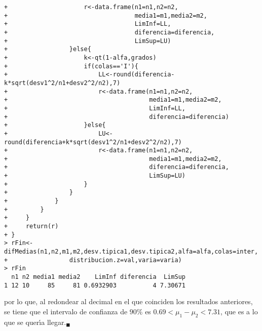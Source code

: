 \begin{solucion}
\begin{verbatim}
+                     r<-data.frame(n1=n1,n2=n2,
+                                   media1=m1,media2=m2,
+                                   LimInf=LL,
+                                   diferencia=diferencia,
+                                   LimSup=LU)
+                 }else{
+                     k<-qt(1-alfa,grados)
+                     if(colas=='I'){
+                         LL<-round(diferencia-k*sqrt(desv1^2/n1+desv2^2/n2),7)
+                         r<-data.frame(n1=n1,n2=n2,
+                                       media1=m1,media2=m2,
+                                       LimInf=LL,
+                                       diferencia=diferencia)
+                     }else{
+                         LU<-round(diferencia+k*sqrt(desv1^2/n1+desv2^2/n2),7)
+                         r<-data.frame(n1=n1,n2=n2,
+                                       media1=m1,media2=m2,
+                                       diferencia=diferencia,
+                                       LimSup=LU)
+                     }
+                 }
+             }
+         }
+     }
+     return(r)
+ }
> rFin<-difMedias(n1,n2,m1,m2,desv.tipica1,desv.tipica2,alfa=alfa,colas=inter,
+                 distribucion.z=val,varia=varia)
> rFin
  n1 n2 media1 media2    LimInf diferencia  LimSup
1 12 10     85     81 0.6932903          4 7.30671
 \end{verbatim}
 \vspace{-0.5cm}
 por lo que, al redondear al decimal en el que coinciden los resultados anteriores, se tiene que el intervalo de confianza de $90\%$ es $0.69 < \mu_1 - \mu_2 < 7.31$, que es a lo que se quer\'{\i}a llegar.${}_{\blacksquare}$
\end{solucion}
